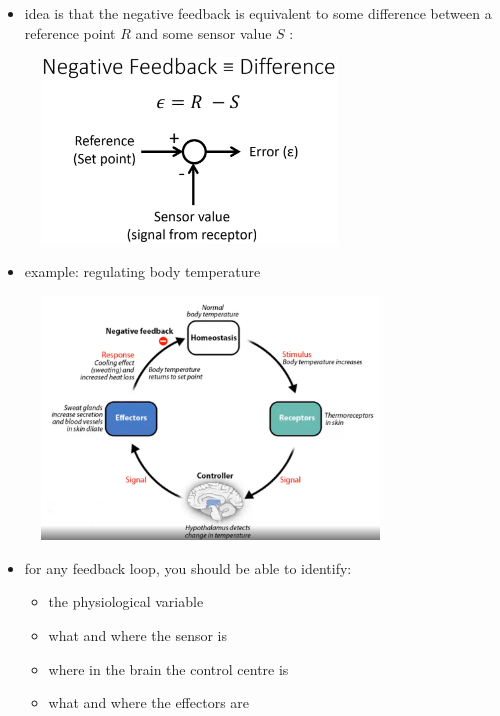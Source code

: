 \documentclass[10pt]{article}
\begin{document}
\begin{itemize}
    \item idea is that the negative feedback is equivalent to some difference between a reference point $R$ and some sensor value $S$ :
\end{itemize}
\begin{figure}[h]
    \centering
    \includegraphics[width=0.7\textwidth]{negFeedbackIsDifference}
    \caption{}
    \label{fig:negFeedbackIsDifference}
\end{figure}
\begin{itemize}
    \item example: regulating body temperature
\end{itemize}
\begin{figure}[h]
    \centering
    \includegraphics[width=0.8\textwidth]{regulateBodyTemperatureFeedbackLoop}
    \caption{}
    \label{fig:regulateBodyTemperatureFeedbackLoop}
\end{figure}
\begin{itemize}
    \item for any feedback loop, you should be able to identify:
    \begin{itemize}
        \item the physiological variable
        \item what and where the sensor is 
        \item where in the brain the control centre is 
        \item what and where the effectors are
    \end{itemize}
\end{itemize}
\end{document}
